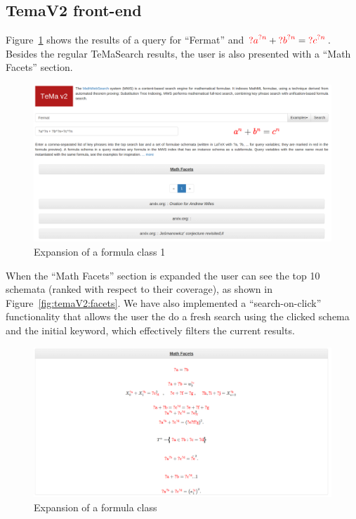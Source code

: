 \documentclass[a4paper,oneside]{article}
\def\red#1{\textcolor{red}{#1}}
\def\tms{\textsf{TeMaSearch}\xspace}
\begin{document}
\subsection{TemaV2 front-end}\label{subsec:fe_results_display2}
Figure~\ref{fig:temaV2_results} shows the results of a query for ``Fermat'' and
${\red{?a}}^{\red{?n}} + {\red{?b}}^{\red{?n}}={\red{?c}}^{\red{?n}}$. Besides
the regular \tms results, the user is also presented with a ``Math Facets''
section.

\begin{figure}[ht]\centering
    \includegraphics[width=12.8cm]{img/temaV2_results.png}
    \caption{Expansion of a formula class 1}\label{fig:temaV2_results}
\end{figure}
\FloatBarrier

When the ``Math Facets'' section is expanded the user can see the top 10
schemata (ranked with respect to their coverage), as shown in
Figure~\ref{fig:temaV2:facets}. We have also implemented a ``search-on-click''
functionality that allows the user the do a fresh search using the clicked
schema and the initial keyword, which effectively filters the current
results.

\begin{figure}[ht]\centering
    \includegraphics[width=12.8cm]{img/temaV2_facets.png}
    \caption{Expansion of a formula class}\label{fig:temaV2_facets}
\end{figure}
\FloatBarrier
\end{document}

